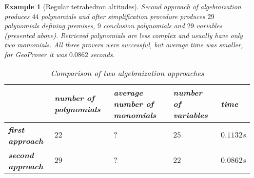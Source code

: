 \documentclass[final,1p,times,authoryear]{elsarticle}
\newtheorem{example}[theorem]{Example}
\begin{document}
\begin{example}[Regular tetrahedron altitudes]
Second approach of algebraization produces $44$ polynomials and after
simplification procedure produces $29$ polynomials defining premises,
$9$ conclusion polynomials and $29$ variables (presented
above). Retrieved polynomials are less complex and usually have only
two monomials. All three provers were successful, but average time was
smaller, for GeoProver it was $0.0862$ seconds.

\begin{table}[!hb]
\begin{center}
\begin{tabular}{L{2cm}||R{2cm}|R{2cm}|R{2cm}|R{1.5cm}}
\                   &  number of polynomials & average number of monomials & number of variables & time \\
\hline
\hline
\textbf{first approach} & $22$ & $?$ & $25$ & $0.1132s$ \\
\hline
\textbf{second approach} & $29$ & $?$ & $22$ & $0.0862s$
\end{tabular}
\caption{Comparison of two algebraization approaches}
\end{center}
\end{table}

\end{example}
\end{document}
